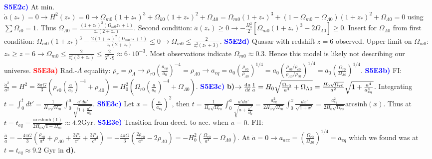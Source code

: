 \documentclass[landscape, a4paper,1pt,english]{article}
\begin{document}
{{{\begin{multicols}{5}
\textcolor{blue}{\textbf{S5E2c)}} At min. $\dot{a}(z_*) = 0\rightarrow H^2(z_*) = 0\rightarrow \Omega_{m0}(1+z_*)^3 + \Omega_{k0}(1+z_*)^2 + \Omega_{\Lambda0} = \Omega_{m0}(1+z_*)^3 + (1-\Omega_{m0}-\Omega_{\Lambda0})(1+z_*)^2 + \Omega_{\Lambda0}= 0$ using $\sum \Omega_{i0} = 1$. Thus $\Omega_{\Lambda0} = \frac{(1+z_*)^2(\Omega_{m0}z_* + 1)}{z_*(2 + z_*)}$. Second condition: $\ddot{a}(z_*)\geq0\rightarrow -\frac{H_0^2}{2}[\Omega_{m0}(1+z_*)^3 - 2\Omega_{\Lambda0}]\geq 0$. Insert for $\Omega_{\Lambda0}$ from first condition: $\Omega_{m0}(1+z_*)^3 - \frac{2(1+z_*)^2(\Omega_{m0}z_* + 1)}{z_*(2+z_*)}\leq0\rightarrow \Omega_{m0}\leq\frac{2}{z_*^2(z_*+3)}$.
\textcolor{blue}{\textbf{S5E2d)}} Quasar with redshift $z=6$ observed. Upper limit on $\Omega_{m0}$: $z_*\geq z = 6\rightarrow\Omega_{m0}\leq \frac{2}{z_*^2(3+z_*)}\leq\frac{2}{6^2\cdot9}\approx6\cdot10^{-3}$. Most observations indicate $\Omega_{m0}\approx0.3$. Hence this model is likely not describing our universe.
\textcolor{red}{\textbf{S5E3a)}} Rad.-$\Lambda$ equality: $\rho_r = \rho_{\Lambda}\rightarrow\rho_{r0}\left(\frac{a_{eq}}{a_0}\right)^{-4} = \rho_{\Lambda0}\rightarrow a_{eq} = a_0\left(\frac{\rho_{r0}}{\rho_{\Lambda0}}\right)^{1/4} =a_0\left( \frac{\rho_{r0}/\rho_{c0}}{\rho_{\Lambda0}/\rho_{c0}}\right)^{1/4} = a_0\left(\frac{\Omega_{r0}}{\Omega_{\Lambda0}}\right)^{1/4}$.
\textcolor{blue}{\textbf{S5E3b)}} FI: $\frac{\dot{a}^2}{a^2} = H^2 = \frac{8\pi G}{3}(\rho_{r0}\left(\frac{a}{a_0}\right)^{-4} + \rho_{\Lambda0}) = H_0^2(\Omega_{r0}\left(\frac{a}{a_0}\right)^{-4} + \Omega_{\Lambda0})$.
\textcolor{blue}{\textbf{S5E3c)}} \textbf{b)}$\rightarrow\dv{a}{t}\frac{1}{a}= H_0\sqrt{\frac{\Omega_{r0}}{a^4} + \Omega_{\Lambda0}} = \frac{H_0\sqrt{\Omega_{r0}}}{a^2}\sqrt{1+\frac{a^4}{a_{eq}^4}}$. Integrating $t = \int_{0}^{t}dt' = \frac{1}{H_0\sqrt{\Omega_{r0}}}\int_{0}^{a}\frac{a'da'}{\sqrt{1+\frac{a'^4}{a_{eq}^4}}}$.
\textcolor{blue}{\textbf{S5E3c)}} Let $x = \left(\frac{a}{a_{eq}}\right)^2$, then $t = \frac{1}{H_0\sqrt{\Omega_{r0}}}\int_{0}^{a}\frac{a'da'}{\sqrt{a+\frac{a'^4}{a_{eq}^4}}} = \frac{a_{eq}^2}{2H_0\sqrt{\Omega_{r0}}}\int_{0}^{x}\frac{dx'}{\sqrt{1+x'}} = \frac{a_{eq}^2}{2H_0\sqrt{\Omega_{r0}}}\text{arcsinh}(x)$. Thus at $t = t_{eq} = \frac{\text{arcshinh}(1)}{2H_0\sqrt{1-\Omega_{r0}}}\approx4.2$Gyr. 
\textcolor{blue}{\textbf{S5E3e)}} Trasition from decel. to acc. when $\ddot{a} = 0$. FII: $\frac{\ddot{a}}{a} = -\frac{4\pi G}{3}\left(\frac{\rho_{r0}}{a^4} +\rho_{\Lambda0} +\frac{3P_r}{c^2} +\frac{3P_\Lambda}{c^2}\right) = -\frac{4\pi G}{3}(\frac{2\rho_{r0}}{a^4} - 2\rho_{\Lambda0}) = -H_0^2\left(\frac{\Omega_{r0}}{a^4} - \Omega_{\Lambda0}\right)$. At $\ddot{a}=0 \rightarrow a_{acc} = \left(\frac{\Omega_{r0}}{\Omega_{\Lambda0}}\right)^{1/4} = a_{eq}$ which we found was at $t = t_{eq}\approx9.2$ Gyr in \textbf{d)}.

\end{multicols}}}}
\end{document}
